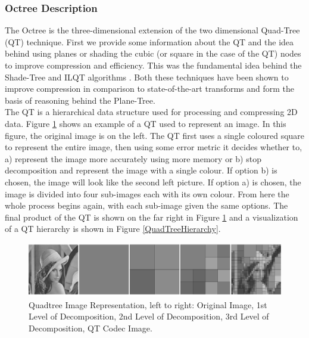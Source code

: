 \subsubsection{Octree Description}
\label{OTDesc}

The Octree is the three-dimensional extension of the two dimensional Quad-Tree (QT) technique. First we provide some information about the QT and the idea behind using planes or shading the cubic (or square in the case of the QT) nodes to improve compression and efficiency. This was the fundamental idea behind the Shade-Tree and ILQT algorithms \cite{Lincoln13Interpolating,Gonzalez07ShadeTree}. Both these techniques have been shown to improve compression in comparison to state-of-the-art transforms and form the basis of reasoning behind the Plane-Tree. \\

The QT is a hierarchical data structure used for processing and compressing 2D data. Figure \ref{QuadtreeExample} shows an example of a QT used to represent an image. In this figure, the original image is on the left. The QT first uses a single coloured square to represent the entire image, then using some error metric it decides whether to, a) represent the image more accurately using more memory or b) stop decomposition and represent the image with a single colour. If option b) is chosen, the image will look like the second left picture. If option a) is chosen, the image is divided into four sub-images each with its own colour. From here the whole process begins again, with each sub-image given the same options. The final product of the QT is shown on the far right in Figure \ref{QuadtreeExample} and a visualization of a QT hierarchy is shown in Figure \ref{QuadTreeHierarchy}. \\


\begin{figure}[!htb]
\centering
\includegraphics[width=12cm]{images/ch2/quadtreeexample}
\caption{Quadtree Image Representation, left to right: Original Image, 1st Level of Decomposition, 2nd Level of Decomposition, 3rd Level of Decomposition, QT Codec Image.}
\label{QuadtreeExample}
\end{figure}


